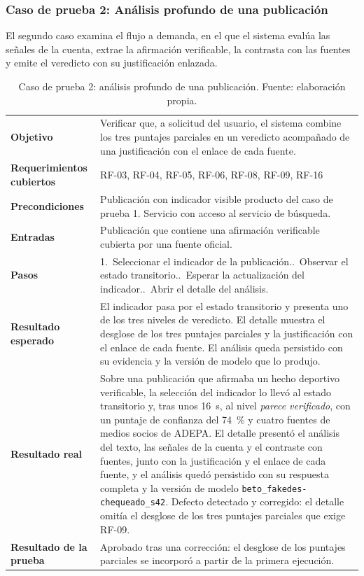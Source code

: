 \subsubsection{Caso de prueba 2: Análisis profundo de una publicación}

El segundo caso examina el flujo a demanda, en el que el sistema evalúa las señales de la cuenta, extrae la afirmación verificable, la contrasta con las fuentes y emite el veredicto con su justificación enlazada.

\begin{small}
\begin{longtable}{@{}>{\raggedright\arraybackslash}p{3.4cm} p{11.8cm}@{}}
  \caption{Caso de prueba 2: análisis profundo de una publicación. Fuente: elaboración propia.}
  \label{tab:cp-02} \\
    \hline
    \textbf{Objetivo} & Verificar que, a solicitud del usuario, el sistema combine los tres puntajes parciales en un veredicto acompañado de una justificación con el enlace de cada fuente. \\
    \textbf{Requerimientos cubiertos} & RF-03, RF-04, RF-05, RF-06, RF-08, RF-09, RF-16 \\
    \textbf{Precondiciones} & Publicación con indicador visible producto del caso de prueba 1. Servicio con acceso al servicio de búsqueda. \\
    \textbf{Entradas} & Publicación que contiene una afirmación verificable cubierta por una fuente oficial. \\
    \textbf{Pasos} & 1.~Seleccionar el indicador de la publicación.\newline 2.~Observar el estado transitorio.\newline 3.~Esperar la actualización del indicador.\newline 4.~Abrir el detalle del análisis. \\
    \textbf{Resultado esperado} & El indicador pasa por el estado transitorio y presenta uno de los tres niveles de veredicto. El detalle muestra el desglose de los tres puntajes parciales y la justificación con el enlace de cada fuente. El análisis queda persistido con su evidencia y la versión de modelo que lo produjo. \\
    \textbf{Resultado real} & Sobre una publicación que afirmaba un hecho deportivo verificable, la selección del indicador lo llevó al estado transitorio y, tras unos 16~s, al nivel \emph{parece verificado}, con un puntaje de confianza del 74~\% y cuatro fuentes de medios socios de ADEPA. El detalle presentó el análisis del texto, las señales de la cuenta y el contraste con fuentes, junto con la justificación y el enlace de cada fuente, y el análisis quedó persistido con su respuesta completa y la versión de modelo \texttt{beto\_fakedes-chequeado\_s42}. Defecto detectado y corregido: el detalle omitía el desglose de los tres puntajes parciales que exige RF-09. \\
    \textbf{Resultado de la prueba} & Aprobado tras una corrección: el desglose de los puntajes parciales se incorporó a partir de la primera ejecución. \\
    \hline
\end{longtable}
\end{small}

